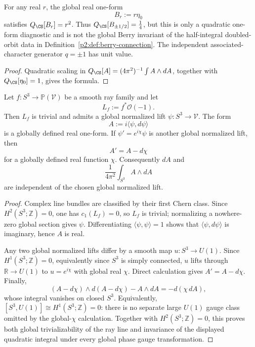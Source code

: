 \documentclass[11pt,a4paper]{article}
\begin{document}
\begin{proposition}
\label{p2d:prop:arbitrary-real-reeb-form-diagnostic}
For any real \(r\), the global real one-form
\[
        B_r:=r\eta_0
\]
satisfies \(Q_{\CS}[B_r]=r^2\).  Thus
\(Q_{\CS}[B_{\pm1/2}]=\tfrac14\), but this is only a quadratic one-form
diagnostic and is not the global Berry invariant of the half-integral
doubled-orbit data in Definition~\ref{p2:def:berry-connection}.  The
independent associated-character generator \(q=\pm1\) has unit value.
\end{proposition}

\begin{proof}
Quadratic scaling in
\(Q_{\CS}[A]=(4\pi^2)^{-1}\int A\wedge dA\), together with
\(Q_{\CS}[\eta_0]=1\), gives the formula.
\end{proof}


\begin{lemma}
\label{p2:lem:global-berry-trivialization}
Let \(f:S^3\to\mathbb P(\mathcal V)\) be a smooth ray family and let
\[
        L_f:=f^*\mathcal O(-1).
\]
Then \(L_f\) is trivial and admits a global normalized lift
\(\psi:S^3\to\mathcal V\).  The form
\[
        A:=i\langle\psi,d\psi\rangle
\]
is a globally defined real one-form.  If
\(\psi'=e^{i\chi}\psi\) is another global normalized lift, then
\[
        A'=A-d\chi
\]
for a globally defined real function \(\chi\).  Consequently \(dA\) and
\[
        \frac1{4\pi^2}\int_{S^3}A\wedge dA
\]
are independent of the chosen global normalized lift.
\end{lemma}

\begin{proof}
Complex line bundles are classified by their first Chern class.  Since
\(H^2(S^3;\mathbb Z)=0\), one has \(c_1(L_f)=0\), so \(L_f\) is trivial;
normalizing a nowhere-zero global section gives \(\psi\).  Differentiating
\(\langle\psi,\psi\rangle=1\) shows that
\(\langle\psi,d\psi\rangle\) is imaginary, hence \(A\) is real.

Any two global normalized lifts differ by a smooth map
\(u:S^3\to U(1)\).  Since \(H^1(S^3;\mathbb Z)=0\), equivalently since
\(S^3\) is simply connected, \(u\) lifts through
\(\mathbb R\to U(1)\) to \(u=e^{i\chi}\) with global real \(\chi\).  Direct
calculation gives \(A'=A-d\chi\).  Finally,
\[
 (A-d\chi)\wedge d(A-d\chi)-A\wedge dA
 =
 -d(\chi\,dA),
\]
whose integral vanishes on closed \(S^3\).
Equivalently,
\([S^3,U(1)]\cong H^1(S^3;\mathbb Z)=0\): there is no separate large
\(U(1)\) gauge class omitted by the global-\(\chi\) calculation.  Together
with \(H^2(S^3;\mathbb Z)=0\), this proves both global trivializability of
the ray line and invariance of the displayed quadratic integral under every
global phase gauge transformation.
\end{proof}
\end{document}
